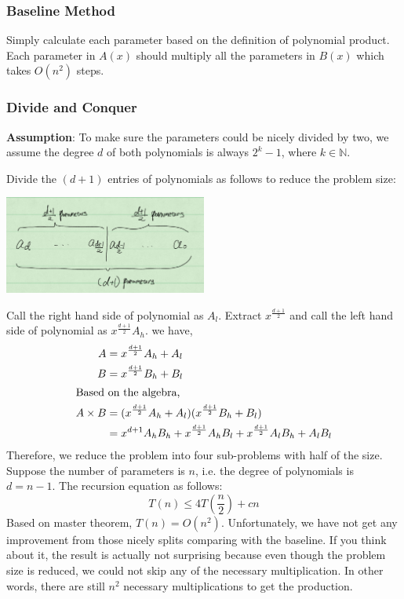 \subsubsection{Baseline Method}
Simply calculate each parameter based on the definition of polynomial product. 
Each parameter in $A(x)$ should multiply all the parameters in $B(x)$ 
which takes $O(n^2)$ steps.
\subsubsection{Divide and Conquer}
\textbf{Assumption}: To make sure the parameters could be nicely divided by 
two, we assume the degree $d$ of both polynomials is always $2^k - 1$, where $k 
\in \mathbb{N}$.

Divide the $(d+1)$ entries of polynomials as follows to reduce the problem size:

\centerline{\includegraphics[width=0.5\textwidth]{poly-devide.png}}

Call the right hand side of polynomial as $A_l$. Extract $x^{\frac{d+1}{2}}$ 
and call the left hand side of polynomial as $x^{\frac{d+1}{2}} A_h$. we have,
\begin{align*}
 A &= x^{\frac{d+1}{2}} A_h + A_l\\
 B &= x^{\frac{d+1}{2}} B_h + B_l\\
 \intertext{Based on the algebra,}
 A \times B &= (x^{\frac{d+1}{2}} A_h + A_l)(x^{\frac{d+1}{2}} B_h + B_l)\\
 &= x^{d+1}A_h B_h + x^{\frac{d+1}{2}}A_h B_l + x^{\frac{d+1}{2}}A_l B_h + A_l 
B_l
\end{align*}
Therefore, we reduce the problem into four sub-problems with half of the size. 
Suppose the number of parameters is $n$, i.e. the degree of polynomials is $d = 
n - 1$. The recursion equation as follows:
\[T(n) \le 4T(\frac{n}{2}) + cn\]
Based on master theorem, $T(n) = O(n^2)$. Unfortunately, we have not get any 
improvement from those nicely splits comparing with the baseline. If you think 
about it, the result is actually not surprising because even though the problem 
size is reduced, we could not skip any of the necessary multiplication. In 
other words, there are still $n^2$ necessary multiplications to get the 
production.

